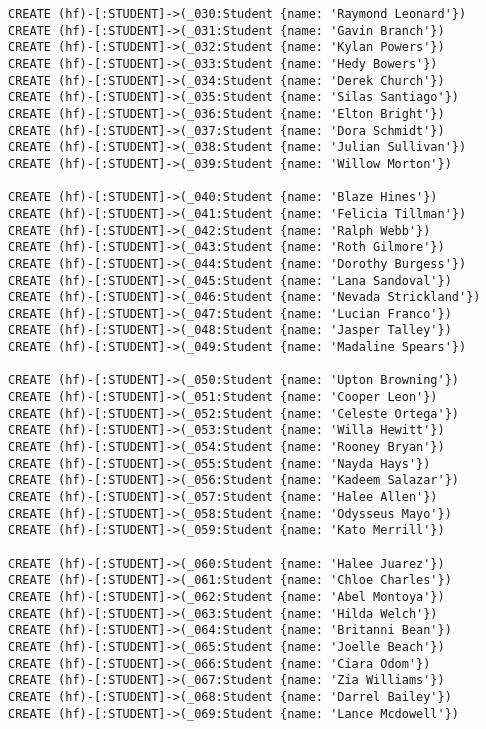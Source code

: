 \begin{lstlisting}
CREATE (hf)-[:STUDENT]->(_030:Student {name: 'Raymond Leonard'})
CREATE (hf)-[:STUDENT]->(_031:Student {name: 'Gavin Branch'})
CREATE (hf)-[:STUDENT]->(_032:Student {name: 'Kylan Powers'})
CREATE (hf)-[:STUDENT]->(_033:Student {name: 'Hedy Bowers'})
CREATE (hf)-[:STUDENT]->(_034:Student {name: 'Derek Church'})
CREATE (hf)-[:STUDENT]->(_035:Student {name: 'Silas Santiago'})
CREATE (hf)-[:STUDENT]->(_036:Student {name: 'Elton Bright'})
CREATE (hf)-[:STUDENT]->(_037:Student {name: 'Dora Schmidt'})
CREATE (hf)-[:STUDENT]->(_038:Student {name: 'Julian Sullivan'})
CREATE (hf)-[:STUDENT]->(_039:Student {name: 'Willow Morton'})

CREATE (hf)-[:STUDENT]->(_040:Student {name: 'Blaze Hines'})
CREATE (hf)-[:STUDENT]->(_041:Student {name: 'Felicia Tillman'})
CREATE (hf)-[:STUDENT]->(_042:Student {name: 'Ralph Webb'})
CREATE (hf)-[:STUDENT]->(_043:Student {name: 'Roth Gilmore'})
CREATE (hf)-[:STUDENT]->(_044:Student {name: 'Dorothy Burgess'})
CREATE (hf)-[:STUDENT]->(_045:Student {name: 'Lana Sandoval'})
CREATE (hf)-[:STUDENT]->(_046:Student {name: 'Nevada Strickland'})
CREATE (hf)-[:STUDENT]->(_047:Student {name: 'Lucian Franco'})
CREATE (hf)-[:STUDENT]->(_048:Student {name: 'Jasper Talley'})
CREATE (hf)-[:STUDENT]->(_049:Student {name: 'Madaline Spears'})

CREATE (hf)-[:STUDENT]->(_050:Student {name: 'Upton Browning'})
CREATE (hf)-[:STUDENT]->(_051:Student {name: 'Cooper Leon'})
CREATE (hf)-[:STUDENT]->(_052:Student {name: 'Celeste Ortega'})
CREATE (hf)-[:STUDENT]->(_053:Student {name: 'Willa Hewitt'})
CREATE (hf)-[:STUDENT]->(_054:Student {name: 'Rooney Bryan'})
CREATE (hf)-[:STUDENT]->(_055:Student {name: 'Nayda Hays'})
CREATE (hf)-[:STUDENT]->(_056:Student {name: 'Kadeem Salazar'})
CREATE (hf)-[:STUDENT]->(_057:Student {name: 'Halee Allen'})
CREATE (hf)-[:STUDENT]->(_058:Student {name: 'Odysseus Mayo'})
CREATE (hf)-[:STUDENT]->(_059:Student {name: 'Kato Merrill'})

CREATE (hf)-[:STUDENT]->(_060:Student {name: 'Halee Juarez'})
CREATE (hf)-[:STUDENT]->(_061:Student {name: 'Chloe Charles'})
CREATE (hf)-[:STUDENT]->(_062:Student {name: 'Abel Montoya'})
CREATE (hf)-[:STUDENT]->(_063:Student {name: 'Hilda Welch'})
CREATE (hf)-[:STUDENT]->(_064:Student {name: 'Britanni Bean'})
CREATE (hf)-[:STUDENT]->(_065:Student {name: 'Joelle Beach'})
CREATE (hf)-[:STUDENT]->(_066:Student {name: 'Ciara Odom'})
CREATE (hf)-[:STUDENT]->(_067:Student {name: 'Zia Williams'})
CREATE (hf)-[:STUDENT]->(_068:Student {name: 'Darrel Bailey'})
CREATE (hf)-[:STUDENT]->(_069:Student {name: 'Lance Mcdowell'})


\end{lstlisting}
